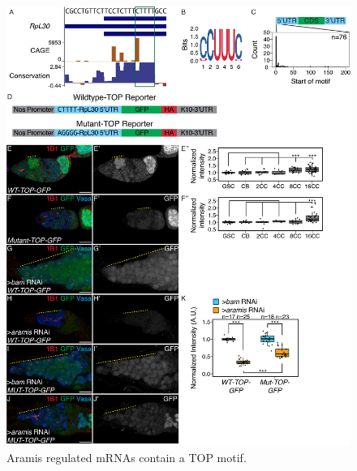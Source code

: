 \documentclass[12pt,oneside]{reedthesis}
\begin{document}
\begin{figure}

{\centering \includegraphics[width=6.5 in,height=8.9375 in]{./figure/Ribosome Biogenesis/Ribosome Biogenesis 6} 

}

\caption[Aramis regulated mRNAs contain a TOP motif.]{Aramis regulated mRNAs contain a TOP motif.}\label{fig:unnamed-chunk-16}
\end{figure}
\textbf{\hfill\break
}
\end{document}

